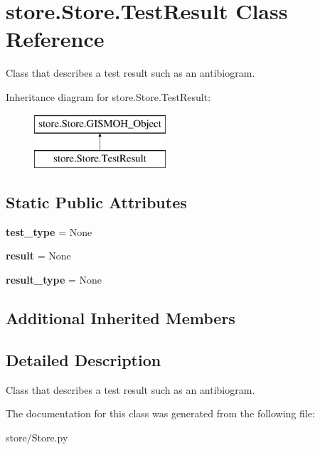 \hypertarget{classstore_1_1_store_1_1_test_result}{\section{store.\-Store.\-Test\-Result Class Reference}
\label{classstore_1_1_store_1_1_test_result}
}


Class that describes a test result such as an antibiogram.  


Inheritance diagram for store.\-Store.\-Test\-Result\-:\begin{figure}[H]
\begin{center}
\leavevmode
\includegraphics[height=2.000000cm]{classstore_1_1_store_1_1_test_result}
\end{center}
\end{figure}
\subsection*{Static Public Attributes}
\begin{DoxyCompactItemize}
\item 
\hypertarget{classstore_1_1_store_1_1_test_result_a314f67cb13f0e2e4d609fd07f4f59c53}{{\bfseries test\-\_\-type} = None}\label{classstore_1_1_store_1_1_test_result_a314f67cb13f0e2e4d609fd07f4f59c53}

\item 
\hypertarget{classstore_1_1_store_1_1_test_result_a745d6c4ef61411bb2175156af2ff963e}{{\bfseries result} = None}\label{classstore_1_1_store_1_1_test_result_a745d6c4ef61411bb2175156af2ff963e}

\item 
\hypertarget{classstore_1_1_store_1_1_test_result_aee14232c5beca52b19d9bfd37b01c8ad}{{\bfseries result\-\_\-type} = None}\label{classstore_1_1_store_1_1_test_result_aee14232c5beca52b19d9bfd37b01c8ad}

\end{DoxyCompactItemize}
\subsection*{Additional Inherited Members}


\subsection{Detailed Description}
Class that describes a test result such as an antibiogram. 

The documentation for this class was generated from the following file\-:\begin{DoxyCompactItemize}
\item 
store/Store.\-py\end{DoxyCompactItemize}
